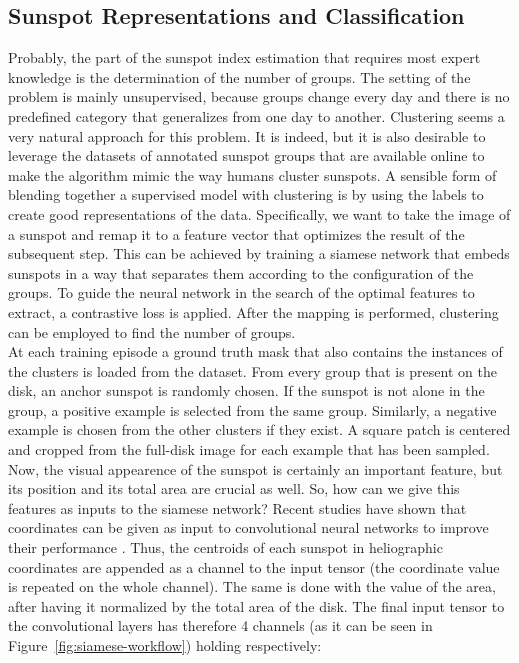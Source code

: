 \subsection{Sunspot Representations and Classification}
Probably, the part of the sunspot index estimation that requires most expert knowledge is the determination of the number of groups. The setting of the problem is mainly unsupervised, because groups change every day and there is no predefined category that generalizes from one day to another. Clustering seems a very natural approach for this problem. It is indeed, but it is also desirable to leverage the datasets of annotated sunspot groups that are available online to make the algorithm mimic the way humans cluster sunspots. A sensible form of blending together a supervised model with clustering is by using the labels to create good representations of the data. Specifically, we want to take the image of a sunspot and remap it to a feature vector that optimizes the result of the subsequent step. This can be achieved by training a siamese network that embeds sunspots in a way that separates them according to the configuration of the groups. To guide the neural network in the search of the optimal features to extract, a contrastive loss is applied. After the mapping is performed, clustering can be employed to find the number of groups.\\
At each training episode a ground truth mask that also contains the instances of the clusters is loaded from the dataset. From every group that is present on the disk, an anchor sunspot is randomly chosen. If the sunspot is not alone in the group, a positive example is selected from the same group. Similarly, a negative example is chosen from the other clusters if they exist. A square patch is centered and cropped from the full-disk image for each example that has been sampled. Now, the visual appearence of the sunspot is certainly an important feature, but its position and its total area are crucial as well. So, how can we give this features as inputs to the siamese network? Recent studies have shown that coordinates can be given as input to convolutional neural networks to improve their performance \cite{liu2018intriguing}. Thus, the centroids of each sunspot in heliographic coordinates are appended as a channel to the input tensor (the coordinate value is repeated on the whole channel). The same is done with the value of the area, after having it normalized by the total area of the disk. The final input tensor to the convolutional layers has therefore 4 channels (as it can be seen in Figure~\ref{fig:siamese-workflow}) holding respectively:
